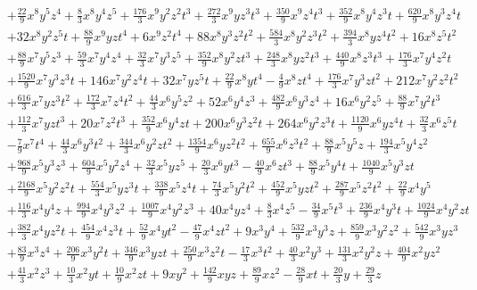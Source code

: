 \documentclass[11pt]{article}
\numberwithin{equation}{section}
\theoremstyle{plain}
\theoremstyle{definition}
\theoremstyle{remark}
\begin{document}
{\begin{align*}
&+\tfrac{22}{9}x^8y^5z^4+\tfrac{8}{3}x^8y^4z^5+\tfrac{176}{3}x^9y^2z^2t^3+\tfrac{272}{3}x^9yz^3t^3+\tfrac{350}{9}x^9z^4t^3+\tfrac{352}{9}x^8y^4z^3t+\tfrac{620}{9}x^8y^3z^4t\\
&+32x^8y^2z^5t+\tfrac{88}{9}x^9yzt^4+6x^9z^2t^4+88x^8y^3z^2t^2+\tfrac{584}{3}x^8y^2z^3t^2+\tfrac{394}{3}x^8yz^4t^2+16x^8z^5t^2\\
&+\tfrac{88}{9}x^7y^5z^3+\tfrac{59}{3}x^7y^4z^4+\tfrac{32}{3}x^7y^3z^5+\tfrac{352}{9}x^8y^2zt^3+\tfrac{248}{3}x^8yz^2t^3+\tfrac{440}{9}x^8z^3t^3+\tfrac{176}{3}x^7y^4z^2t\\
&+\tfrac{1520}{9}x^7y^3z^3t+146x^7y^2z^4t+32x^7yz^5t+\tfrac{22}{9}x^8yt^4-\tfrac{4}{9}x^8zt^4+\tfrac{176}{3}x^7y^3zt^2+212x^7y^2z^2t^2\\
&+\tfrac{616}{3}x^7yz^3t^2+\tfrac{172}{3}x^7z^4t^2+\tfrac{44}{3}x^6y^5z^2+52x^6y^4z^3+\tfrac{482}{9}x^6y^3z^4+16x^6y^2z^5+\tfrac{88}{9}x^7y^2t^3\\
&+\tfrac{112}{3}x^7yzt^3+20x^7z^2t^3+\tfrac{352}{9}x^6y^4zt+200x^6y^3z^2t+264x^6y^2z^3t+\tfrac{1120}{9}x^6yz^4t+\tfrac{32}{3}x^6z^5t\\
&-\tfrac{7}{9}x^7t^4+\tfrac{44}{3}x^6y^3t^2+\tfrac{344}{3}x^6y^2zt^2+\tfrac{1354}{9}x^6yz^2t^2+\tfrac{655}{9}x^6z^3t^2+\tfrac{88}{9}x^5y^5z+\tfrac{194}{3}x^5y^4z^2\\
&+\tfrac{968}{9}x^5y^3z^3+\tfrac{604}{9}x^5y^2z^4+\tfrac{32}{3}x^5yz^5+\tfrac{20}{3}x^6yt^3-\tfrac{40}{9}x^6zt^3+\tfrac{88}{9}x^5y^4t+\tfrac{1040}{9}x^5y^3zt\\
&+\tfrac{2168}{9}x^5y^2z^2t+\tfrac{554}{3}x^5yz^3t+\tfrac{338}{9}x^5z^4t+\tfrac{74}{3}x^5y^2t^2+\tfrac{452}{9}x^5yzt^2+\tfrac{287}{9}x^5z^2t^2+\tfrac{22}{9}x^4y^5\\
&+\tfrac{116}{3}x^4y^4z+\tfrac{994}{9}x^4y^3z^2+\tfrac{1007}{9}x^4y^2z^3+40x^4yz^4+\tfrac{8}{3}x^4z^5-\tfrac{34}{9}x^5t^3+\tfrac{236}{9}x^4y^3t+\tfrac{1024}{9}x^4y^2zt\\
&+\tfrac{382}{3}x^4yz^2t+\tfrac{454}{9}x^4z^3t+\tfrac{52}{9}x^4yt^2-\tfrac{47}{9}x^4zt^2+9x^3y^4+\tfrac{532}{9}x^3y^3z+\tfrac{859}{9}x^3y^2z^2+\tfrac{542}{9}x^3yz^3\\
&+\tfrac{83}{9}x^3z^4+\tfrac{206}{9}x^3y^2t+\tfrac{346}{9}x^3yzt+\tfrac{250}{9}x^3z^2t-\tfrac{17}{3}x^3t^2+\tfrac{40}{3}x^2y^3+\tfrac{131}{3}x^2y^2z+\tfrac{404}{9}x^2yz^2\\
&+\tfrac{41}{3}x^2z^3+\tfrac{10}{3}x^2yt+\tfrac{10}{9}x^2zt+9xy^2+\tfrac{142}{9}xyz+\tfrac{89}{9}xz^2-\tfrac{28}{9}xt+\tfrac{20}{3}y+\tfrac{29}{3}z
\end{align*}
}
\end{document}
